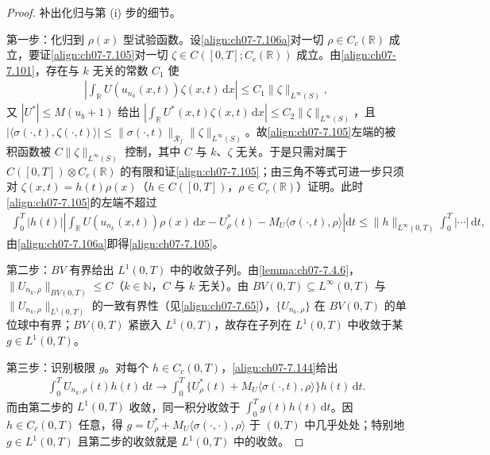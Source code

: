 \documentclass[../../main.tex]{subfiles}%
\begin{document}
\begin{proof}
补出化归与第 (i) 步的细节。

第一步：化归到 $\rho(x)$ 型试验函数。设\eqref{align:ch07-7.106a}对一切 $\rho\in C_c(\mathbb{R})$ 成立，要证\eqref{align:ch07-7.105}对一切 $\zeta\in C([0,T];C_c(\mathbb{R}))$ 成立。由\eqref{align:ch07-7.101}，存在与 $k$ 无关的常数 $C_1$ 使
\begin{align*}
\left|\int_{\mathbb{R}}U(u_{n_k}(x,t))\zeta(x,t)\,\mathrm{d}x\right|\leqslant C_1\|\zeta\|_{L^\infty(S)},
\end{align*}
又 $|U^*|\leqslant M(u_b+1)$ 给出 $\left|\int_{\mathbb{R}}U^*(x,t)\zeta(x,t)\,\mathrm{d}x\right|\leqslant C_2\|\zeta\|_{L^\infty(S)}$，且 $|\langle\sigma(\cdot,t),\zeta(\cdot,t)\rangle|\leqslant\|\sigma(\cdot,t)\|_{\mathscr{R}_f}\|\zeta\|_{L^\infty(S)}$。故\eqref{align:ch07-7.105}左端的被积函数被 $C\|\zeta\|_{L^\infty(S)}$ 控制，其中 $C$ 与 $k$、$\zeta$ 无关。于是只需对属于 $C([0,T])\otimes C_c(\mathbb{R})$ 的有限和证\eqref{align:ch07-7.105}；由三角不等式可进一步只须对 $\zeta(x,t)=h(t)\rho(x)$（$h\in C([0,T])$，$\rho\in C_c(\mathbb{R})$）证明。此时\eqref{align:ch07-7.105}的左端不超过
\begin{align*}
\int_0^T|h(t)|\left|\int_{\mathbb{R}}U(u_{n_k}(x,t))\rho(x)\,\mathrm{d}x-U_\rho^*(t)-M_U\langle\sigma(\cdot,t),\rho\rangle\right|\mathrm{d}t
\leqslant\|h\|_{L^\infty(0,T)}\int_0^T|\cdots|\,\mathrm{d}t,
\end{align*}
由\eqref{align:ch07-7.106a}即得\eqref{align:ch07-7.105}。

第二步：$BV$ 有界给出 $L^1(0,T)$ 中的收敛子列。由\cref{lemma:ch07-7.4.6}，$\|U_{n_k,\rho}\|_{BV(0,T)}\leqslant C$（$k\in\mathbb{N}$，$C$ 与 $k$ 无关）。由 $BV(0,T)\subseteq L^\infty(0,T)$ 与 $\|U_{n_k,\rho}\|_{L^1(0,T)}$ 的一致有界性（见\eqref{align:ch07-7.65}），$\{U_{n_k,\rho}\}$ 在 $BV(0,T)$ 的单位球中有界；$BV(0,T)$ 紧嵌入 $L^1(0,T)$，故存在子列在 $L^1(0,T)$ 中收敛于某 $g\in L^1(0,T)$。

第三步：识别极限 $g$。对每个 $h\in C_c(0,T)$，\eqref{align:ch07-7.144}给出
\begin{align*}
\int_0^TU_{n_k,\rho}(t)h(t)\,\mathrm{d}t\to\int_0^T\Big\{U_\rho^*(t)+M_U\langle\sigma(\cdot,t),\rho\rangle\Big\}h(t)\,\mathrm{d}t.
\end{align*}
而由第二步的 $L^1(0,T)$ 收敛，同一积分收敛于 $\int_0^Tg(t)h(t)\,\mathrm{d}t$。因 $h\in C_c(0,T)$ 任意，得 $g=U_\rho^*+M_U\langle\sigma(\cdot,\cdot),\rho\rangle$ 于 $(0,T)$ 中几乎处处；特别地 $g\in L^1(0,T)$ 且第二步的收敛就是 $L^1(0,T)$ 中的收敛。


\end{proof}
\end{document}
